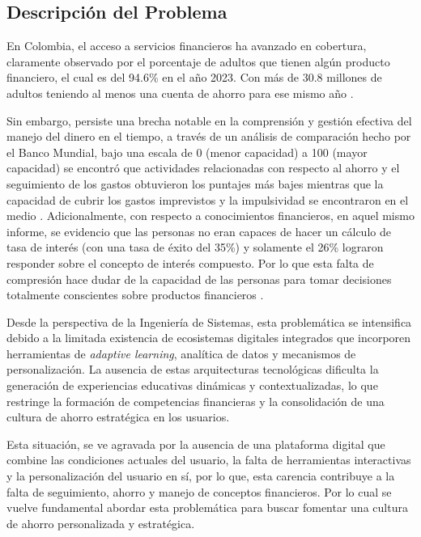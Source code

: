 \subsection*{Descripción del Problema}
En Colombia, el acceso a servicios financieros ha avanzado en cobertura, claramente observado por el porcentaje de adultos que tienen algún producto financiero, el cual es del 94.6\% en el año 2023. Con más de 30.8 millones de adultos teniendo al menos una cuenta de ahorro para ese mismo año \parencite{BancadeOportunidades01}.

Sin embargo, persiste una brecha notable en la comprensión y gestión efectiva del manejo del dinero en el tiempo, a través de un análisis de comparación hecho por el Banco Mundial, bajo una escala de 0 (menor capacidad) a 100 (mayor capacidad) se encontró que actividades relacionadas con respecto al ahorro y el seguimiento de los gastos obtuvieron los puntajes más bajes mientras que la capacidad de cubrir los gastos imprevistos y la impulsividad se encontraron en el medio \parencite[p.~34-35]{BancoMundial01}. Adicionalmente, con respecto a conocimientos financieros, en aquel mismo informe, se evidencio que las personas no eran capaces de hacer un cálculo de tasa de interés (con una tasa de éxito del 35\%) y solamente el 26\% lograron responder sobre el concepto de interés compuesto. Por lo que esta falta de compresión hace dudar de la capacidad de las personas para tomar decisiones totalmente conscientes sobre productos financieros \parencite[p.~29]{BancoMundial01}.

Desde la perspectiva de la Ingeniería de Sistemas, esta problemática se intensifica debido a la limitada existencia de ecosistemas digitales integrados que incorporen herramientas de \textit{adaptive learning}, analítica de datos y mecanismos de personalización. La ausencia de estas arquitecturas tecnológicas dificulta la generación de experiencias educativas dinámicas y contextualizadas, lo que restringe la formación de competencias financieras y la consolidación de una cultura de ahorro estratégica en los usuarios.

Esta situación, se ve agravada por la ausencia de una plataforma digital que combine las condiciones actuales del usuario, la falta de herramientas interactivas y la personalización del usuario en sí, por lo que, esta carencia contribuye a la falta de seguimiento, ahorro y manejo de conceptos financieros. Por lo cual se vuelve fundamental abordar esta problemática para buscar fomentar una cultura de ahorro personalizada y estratégica.